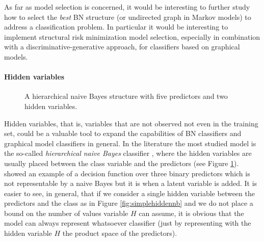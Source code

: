 \documentclass[11pt,a4paper, twoside]{book}
\begin{document}
As far as model selection is concerned, it would be interesting to further study how to select the \textit{best} BN structure (or undirected graph in Markov models) to address a classification problem. In particular it would be interesting to implement structural risk minimization model selection, especially in combination with a discriminative-generative approach, for classifiers based on graphical models. 

\paragraph{Hidden variables}

\begin{figure}
\centering
{}  

\caption{A hierarchical naive Bayes structure with five predictors and two hidden variables.}
\label{fig:hierNB}
\end{figure}

Hidden variables, that is, variables that are not observed not even in the training set, could be a valuable tool to expand the capabilities of BN classifiers and graphical model classifiers in general. In the literature the most studied model is the so-called \textit{hierarchical naive Bayes} classifier \citep{Han2005, Langseth2006, flores2009, njah2016}, where the hidden variables are usually placed between the class variable and the predictors (see Figure \ref{fig:hierNB}).
\cite{Langseth2006} showed an example of a decision function over three binary predictors which is not representable by a naive Bayes but it is when a latent variable is added. It is easier to see, in general, that if we consider a single hidden variable between the predictors and the class as in Figure \ref{fig:simplehiddennb} and we do not place a bound on the number of values  variable $H$ can assume, it is obvious that the model can always represent whatsoever classifier (just by representing with the hidden variable $H$ the product space of the predictors).
\end{document}
